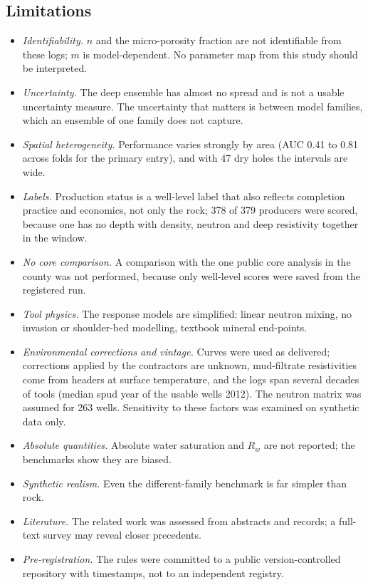 \documentclass[preprint,12pt]{elsarticle}
\begin{document}
\subsection{Limitations}
\begin{itemize}
\item \emph{Identifiability.} $n$ and the micro-porosity fraction are not identifiable from
these logs; $m$ is model-dependent. No parameter map from this study should be interpreted.
\item \emph{Uncertainty.} The deep ensemble has almost no spread and is not a usable uncertainty
measure. The uncertainty that matters is between model families, which an ensemble of one
family does not capture.
\item \emph{Spatial heterogeneity.} Performance varies strongly by area (AUC 0.41 to 0.81
across folds for the primary entry), and with 47 dry holes the intervals are wide.
\item \emph{Labels.} Production status is a well-level label that also reflects completion
practice and economics, not only the rock; 378 of 379 producers were scored, because one has no
depth with density, neutron and deep resistivity together in the window.
\item \emph{No core comparison.} A comparison with the one public core analysis in the county
was not performed, because only well-level scores were saved from the registered run.
\item \emph{Tool physics.} The response models are simplified: linear neutron mixing, no
invasion or shoulder-bed modelling, textbook mineral end-points.
\item \emph{Environmental corrections and vintage.} Curves were used as delivered; corrections
applied by the contractors are unknown, mud-filtrate resistivities come from headers at surface
temperature, and the logs span several decades of tools (median spud year of the usable wells 2012). The neutron
matrix was assumed for 263 wells. Sensitivity to these factors was examined on synthetic data
only.
\item \emph{Absolute quantities.} Absolute water saturation and $R_w$ are not reported; the
benchmarks show they are biased.
\item \emph{Synthetic realism.} Even the different-family benchmark is far simpler than rock.
\item \emph{Literature.} The related work was assessed from abstracts and records; a full-text
survey may reveal closer precedents.
\item \emph{Pre-registration.} The rules were committed to a public version-controlled
repository with timestamps, not to an independent registry.
\end{itemize}
\end{document}
